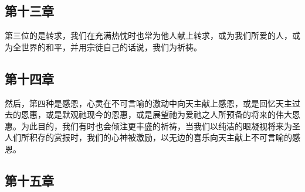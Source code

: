 
\subsection{第十三章}

\par

第三位的是转求，我们在充满热忱时也常为他人献上转求，或为我们所爱的人，或为全世界的和平，并用宗徒自己的话说，我们为祈祷。\par


\subsection{第十四章}

\par

然后，第四种是感恩，心灵在不可言喻的激动中向天主献上感恩，或是回忆天主过去的恩惠，或是默观祂现今的恩惠，或是展望祂为爱祂之人所预备的将来的伟大恩惠。为此目的，我们有时也会倾注更丰盛的祈祷，当我们以纯洁的眼凝视将来为圣人们所积存的赏报时，我们的心神被激励，以无边的喜乐向天主献上不可言喻的感恩。\par


\subsection{第十五章}

\par

